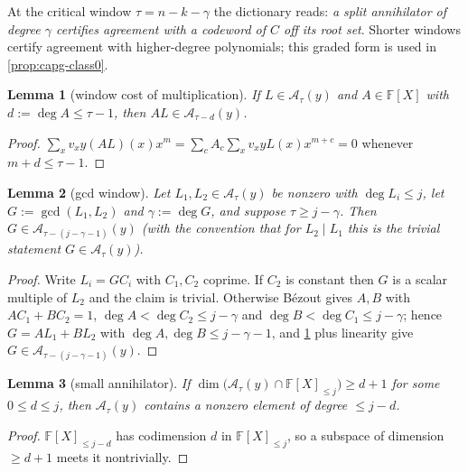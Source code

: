 \documentclass[11pt]{article}
\newtheorem{lemma}[lemma]{Lemma}
\theoremstyle{definition}
\theoremstyle{remark}
\newcommand{\F}{\mathbb{F}}
\begin{document}
At the critical window $\tau=n-k-\gamma$ the dictionary reads: \emph{a split
annihilator of degree $\gamma$ certifies agreement with a codeword of $C$
off its root set}.  Shorter windows certify agreement with higher-degree
polynomials; this graded form is used in \cref{prop:capg-class0}.

\begin{lemma}[window cost of multiplication]\label{lem:capg-window}
If $L\in\mathcal{A}_\tau(y)$ and $A\in\F[X]$ with $d:=\deg A\leq\tau-1$,
then $AL\in\mathcal{A}_{\tau-d}(y)$.
\end{lemma}

\begin{proof}
$\sum_x v_xy(AL)(x)x^m=\sum_{c}A_c\sum_x v_xyL(x)x^{m+c}=0$ whenever
$m+d\leq\tau-1$.
\end{proof}

\begin{lemma}[gcd window]\label{lem:capg-gcdwindow}
Let $L_1,L_2\in\mathcal{A}_\tau(y)$ be nonzero with $\deg L_i\leq j$, let
$G:=\gcd(L_1,L_2)$ and $\gamma:=\deg G$, and suppose $\tau\geq j-\gamma$.
Then $G\in\mathcal{A}_{\tau-(j-\gamma-1)}(y)$ (with the convention that for
$L_2\mid L_1$ this is the trivial statement $G\in\mathcal{A}_\tau(y)$).
\end{lemma}

\begin{proof}
Write $L_i=GC_i$ with $C_1,C_2$ coprime.  If $C_2$ is constant then
$G$ is a scalar multiple of $L_2$ and the claim is trivial.  Otherwise
B\'ezout gives $A,B$ with $AC_1+BC_2=1$, $\deg A<\deg C_2\leq j-\gamma$ and
$\deg B<\deg C_1\leq j-\gamma$; hence $G=AL_1+BL_2$ with
$\deg A,\deg B\leq j-\gamma-1$, and \cref{lem:capg-window} plus linearity
give $G\in\mathcal{A}_{\tau-(j-\gamma-1)}(y)$.
\end{proof}

\begin{lemma}[small annihilator]\label{lem:capg-small}
If $\dim\big(\mathcal{A}_\tau(y)\cap\F[X]_{\leq j}\big)\geq d+1$ for some
$0\leq d\leq j$, then $\mathcal{A}_\tau(y)$ contains a nonzero element of
degree $\leq j-d$.
\end{lemma}

\begin{proof}
$\F[X]_{\leq j-d}$ has codimension $d$ in $\F[X]_{\leq j}$, so a subspace of
dimension $\geq d+1$ meets it nontrivially.
\end{proof}
\end{document}
